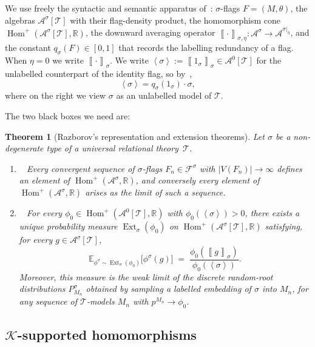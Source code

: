 \documentclass[11pt]{article}
\newtheorem{theorem}{Theorem}
\theoremstyle{definition}
\newcommand{\R}{\mathbb{R}}
\newcommand{\E}{\mathbb{E}}
\newcommand{\A}{\mathcal{A}}
\newcommand{\F}{\mathcal{F}}
\newcommand{\K}{\mathcal{K}}
\newcommand{\T}{\mathcal{T}}
\newcommand{\Homp}{\operatorname{Hom}^{+}}
\newcommand{\Ext}{\operatorname{Ext}}
\newcommand{\brak}[1]{\left\langle #1\right\rangle}
\newcommand{\avg}[2]{\left\llbracket #1 \right\rrbracket_{#2}}
\begin{document}
We use freely the syntactic and semantic apparatus of~\cite{Razborov2007}:
$\sigma$-flags $F=(M,\theta)$, the algebras $\A^\sigma[\T]$ with their
flag-density product, the homomorphism cone
$\Homp(\A^\sigma[\T],\R)$, the downward averaging operator
$\avg{\cdot}{\sigma,\eta}:\A^\sigma\to\A^{\sigma\vert_\eta}$, and the
constant $q_\sigma(F)\in[0,1]$ that records the labelling redundancy of a
flag.  When $\eta=0$ we write $\avg{\cdot}{\sigma}$.  We write
$\brak\sigma:=\avg{1_\sigma}\sigma\in\A^0[\T]$ for the unlabelled
counterpart of the identity flag, so by~\cite[Theorem~2.5\,(b)]{Razborov2007},
\[
  \brak\sigma = q_\sigma(1_\sigma)\cdot\sigma,
\]
where on the right we view $\sigma$ as an unlabelled model of $\T$.

The two black boxes we need are:

\begin{theorem}[Razborov's representation and extension theorems]\label{thm:razborov}
Let $\sigma$ be a non-degenerate type of a universal relational
theory~$\T$.
\begin{enumerate}[label=\textup{(\roman*)}, leftmargin=2.5em]
\item~\cite[Theorem~3.3]{Razborov2007}
Every convergent sequence of $\sigma$-flags
$F_n\in\F^\sigma$ with $|V(F_n)|\to\infty$ defines an element of
$\Homp(\A^\sigma,\R)$, and conversely every element of
$\Homp(\A^\sigma,\R)$ arises as the limit of such a sequence.
\item~\cite[Theorems~3.5,~3.12]{Razborov2007}
For every $\phi_0\in\Homp(\A^0[\T],\R)$ with $\phi_0(\brak\sigma)>0$,
there exists a unique probability measure $\Ext_\sigma(\phi_0)$ on
$\Homp(\A^\sigma[\T],\R)$ satisfying, for every $g\in\A^\sigma[\T]$,
\begin{equation}\label{eq:extension-expectation}
  \E_{\phi^\sigma\sim\Ext_\sigma(\phi_0)}\bigl[\phi^\sigma(g)\bigr]
  \;=\;
  \frac{\phi_0(\avg g\sigma)}{\phi_0(\brak\sigma)}.
\end{equation}
Moreover, this measure is the weak limit of the discrete random-root
distributions $P^\sigma_{M_n}$ obtained by sampling a labelled embedding
of $\sigma$ into $M_n$, for any sequence of $\T$-models $M_n$ with
$p^{M_n}\to\phi_0$.
\end{enumerate}
\end{theorem}

\subsection{\texorpdfstring{$\K$}{K}-supported homomorphisms}
\end{document}
